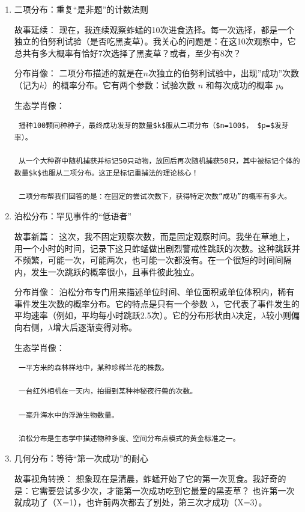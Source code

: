 \documentclass[
]{book}
\begin{document}
\begin{enumerate}
\def\labelenumi{\arabic{enumi}.}
\setcounter{enumi}{1}
\item
  二项分布：重复``是非题''的计数法则

  故事延续： 现在，我连续观察蚱蜢的10次进食选择。每一次选择，都是一个独立的伯努利试验（是否吃黑麦草）。我关心的问题是：在这10次观察中，它总共有多大概率有恰好7次选择了黑麦草？或者，至少有8次？

  分布肖像： 二项分布描述的就是在\(n\)次独立的伯努利试验中，出现''成功''次数（记为\(k\)）的概率分布。它有两个参数：试验次数 \(n\) 和每次成功的概率 \(p\)。

  生态学肖像：

\begin{verbatim}
 播种100颗同种种子，最终成功发芽的数量$k$服从二项分布（$n=100$， $p=$发芽率）。

 从一个大种群中随机捕获并标记50只动物，放回后再次随机捕获50只，其中被标记个体的数量$k$也服从二项分布。这正是标记重捕法的理论核心！

 二项分布帮我们回答的是：在固定的尝试次数下，获得特定次数“成功”的概率有多大。
\end{verbatim}
\item
  泊松分布：罕见事件的``低语者''

  故事新篇： 这次，我不固定观察次数，而是固定观察时间。我坐在草地上，用一个小时的时间，记录下这只蚱蜢做出剧烈警戒性跳跃的次数。这种跳跃并不频繁，可能一次，可能两次，也可能一次都没有。在一个很短的时间间隔内，发生一次跳跃的概率很小，且事件彼此独立。

  分布肖像： 泊松分布专门用来描述单位时间、单位面积或单位体积内，稀有事件发生次数的概率分布。它的特点是只有一个参数 \(\lambda\)，它代表了事件发生的平均速率（例如，平均每小时跳跃2.5次）。它的分布形状由\(\lambda\)决定，\(\lambda\)较小则偏向右侧，\(\lambda\)增大后逐渐变得对称。

  生态学肖像：

\begin{verbatim}
 一平方米的森林样地中，某种珍稀兰花的株数。

 一台红外相机在一天内，拍摄到某种神秘夜行兽的次数。

 一毫升海水中的浮游生物数量。

 泊松分布是生态学中描述物种多度、空间分布点模式的黄金标准之一。
\end{verbatim}
\item
  几何分布：等待``第一次成功''的耐心

  故事视角转换： 想象现在是清晨，蚱蜢开始了它的第一次觅食。我好奇的是：它需要尝试多少次，才能第一次成功吃到它最爱的黑麦草？ 也许第一次就成功了（X=1），也许前两次都去了别处，第三次才成功（X=3）。


\end{enumerate}
\end{document}

